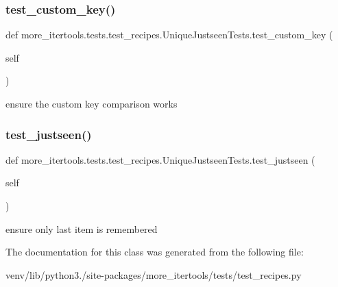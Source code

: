 \subsubsection{\texorpdfstring{test\+\_\+custom\+\_\+key()}{test\_custom\_key()}}
{\footnotesize\ttfamily def more\+\_\+itertools.\+tests.\+test\+\_\+recipes.\+Unique\+Justseen\+Tests.\+test\+\_\+custom\+\_\+key (\begin{DoxyParamCaption}\item[{}]{self }\end{DoxyParamCaption})}

\begin{DoxyVerb}ensure the custom key comparison works\end{DoxyVerb}
 \mbox{\label{classmore__itertools_1_1tests_1_1test__recipes_1_1_unique_justseen_tests_a08caf99d3d49be3ce53998a075710a82}} 
\subsubsection{\texorpdfstring{test\+\_\+justseen()}{test\_justseen()}}
{\footnotesize\ttfamily def more\+\_\+itertools.\+tests.\+test\+\_\+recipes.\+Unique\+Justseen\+Tests.\+test\+\_\+justseen (\begin{DoxyParamCaption}\item[{}]{self }\end{DoxyParamCaption})}

\begin{DoxyVerb}ensure only last item is remembered\end{DoxyVerb}
 

The documentation for this class was generated from the following file\+:\begin{DoxyCompactItemize}
\item 
venv/lib/python3./site-\/packages/more\+\_\+itertools/tests/test\+\_\+recipes.\+py\end{DoxyCompactItemize}
